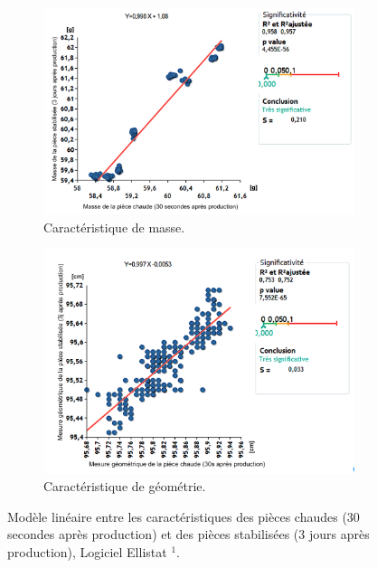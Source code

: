 \begin{figure}[hbtp] \label{fig:corr_results}
	\centering
	\begin{subfigure}[c]{0.48\textwidth}
		\includegraphics[width=\textwidth]{../Chap2/Figures/Capture_2019-09-20_12_19_12.png}
		\caption{Caractéristique de masse.}
	\end{subfigure}
	\begin{subfigure}[c]{0.48\textwidth}
		\includegraphics[width=\textwidth]{../Chap2/Figures/Capture_2019-09-20_12_18_57.png}
		\caption{Caractéristique de géométrie.}
	\end{subfigure}
	\caption[Modèle linéaire entre les caractéristiques des pièces chaudes et des pièces froides.]{Modèle linéaire entre les caractéristiques des pièces chaudes (30 secondes après production) et des pièces stabilisées (3 jours après production), Logiciel Ellistat $^1$.}
\end{figure}
{}

